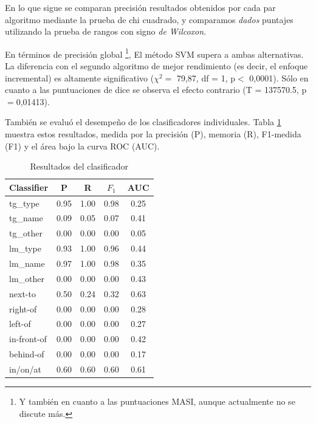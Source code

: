 

En lo que sigue se comparan precisi\'on resultados obtenidos por cada par algoritmo mediante la prueba de chi cuadrado, y comparamos {\em dados} puntajes utilizando la prueba de rangos con signo {\em de Wilcoxon}.

En t\'erminos de precisi\'on global \footnote{Y tambi\'en en cuanto a las puntuaciones MASI, aunque actualmente no se discute m\'as.}, El m\'etodo SVM supera a ambas alternativas. La diferencia con el segundo algoritmo de mejor rendimiento (es decir, el enfoque incremental) es altamente significativo ($\chi^{2}=$ 79,87, df = 1, p$<$ 0,0001). S\'olo en cuanto a las puntuaciones de dice se observa el efecto contrario (T = 137570.5, p$=$0,01413).

Tambi\'en se evalu\'o el desempe\~no de los clasificadores individuales. Tabla \ref{tab-svm-results} muestra estos resultados, medida por la precisi\'on (P), memoria (R), F1-medida (F1) y el \'area bajo la curva ROC (AUC).

\begin{table}[H]
\begin{center}
\footnotesize{

\begin{tabular}{l c c c c }
\hline
{{Classifier}}	& {P} & {R} & {$F_{1}$} & {AUC} \\
\hline
{{tg\_type}} 			& 0.95 & 1.00 & 0.98 & 0.25 \\
{{tg\_name}}			& 0.09 & 0.05 & 0.07 & 0.41 \\
{{tg\_other}}			& 0.00 & 0.00 & 0.00 & 0.05 \\                               
{{lm\_type}}			& 0.93 & 1.00 & 0.96 & 0.44 \\                               
{{lm\_name}}			& 0.97 & 1.00 & 0.98 & 0.35 \\                               
{{lm\_other}}			& 0.00 & 0.00 & 0.00 & 0.43 \\                               
{{next-to}}				& 0.50 & 0.24 & 0.32 & 0.63 \\                               
{{right-of}}			& 0.00 & 0.00 & 0.00 & 0.28 \\                               
{{left-of}}				& 0.00 & 0.00 & 0.00 & 0.27 \\                               
{{in-front-of}}		& 0.00 & 0.00 & 0.00 & 0.42 \\                               
{{behind-of}}			& 0.00 & 0.00 & 0.00 & 0.17 \\                               
{{in/on/at}} 			& 0.60 & 0.60 & 0.60 & 0.61 \\                               
\hline                   
\end{tabular}
\caption{Resultados del clasificador}
\label{tab-svm-results}
}
\end{center}
\end{table}
\normalsize

